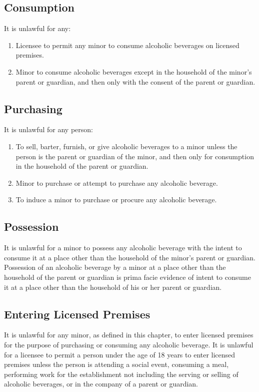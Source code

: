 \subsection{Consumption}
It is unlawful for any:
\begin{enumerate}[{\indent}1)]
    \item Licensee to permit any minor to consume alcoholic beverages on licensed premises.
    \item Minor to consume alcoholic beverages except in the household of the minor’s parent or guardian, and then only with the consent of the parent or guardian.
\end{enumerate}
\subsection{Purchasing}
It is unlawful for any person:
\begin{enumerate}[{\indent}1)]
    \item To sell, barter, furnish, or give alcoholic beverages to a minor unless the person is the parent or guardian of the minor, and then only for consumption in the household of the parent or guardian.
    \item Minor to purchase or attempt to purchase any alcoholic beverage.
    \item To induce a minor to purchase or procure any alcoholic beverage.
\end{enumerate}
\subsection{Possession}
It is unlawful for a minor to possess any alcoholic beverage with the intent to consume it at a place other than the household of the minor’s parent or guardian.  Possession of an alcoholic beverage by a minor at a place other than the household of the parent or guardian is prima facie evidence of intent to consume it at a place other than the household of his or her parent or guardian.
\subsection{Entering Licensed Premises}
It is unlawful for any minor, as defined in this chapter, to enter licensed premises for the purpose of purchasing or consuming any alcoholic beverage.  It is unlawful for a licensee to permit a person under the age of 18 years to enter licensed premises unless the person is attending a social event, consuming a meal, performing work for the establishment not including the serving or selling of alcoholic beverages, or in the company of a parent or guardian.
